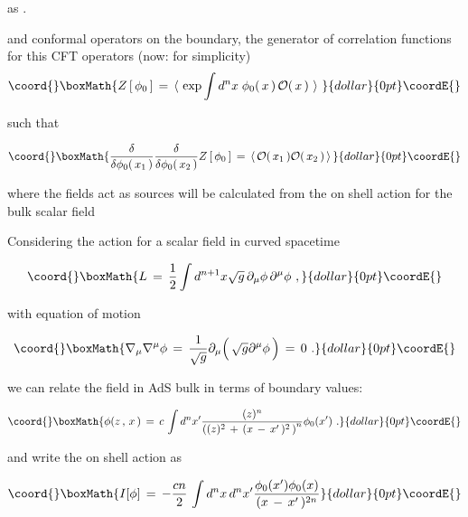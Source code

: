 \documentclass[a4paper,twocolumn,prd,groupedaddress,nofootinbib]{revtex4}
\begin{document}
\bigskip
 \coordHE{}  
as  \coordHE{}.

\vskip1cm

\noindent and conformal operators \coordHE{} on the boundary, 
the generator of correlation functions for this  CFT operators
(now: \coordHE{} for simplicity) 
$$\coord{}\boxMath{
Z\,[\,\phi_0 \,]\,=\, \langle \,\,\exp \int d^{n}x\; \phi_0 (\,x\,)\,
{\cal O} (\,x\,)\,\,\rangle\,\,
\nonumber
}{dollar}{0pt}\coordE{}$$

\noindent such that


$$\coord{}\boxMath{ 
{\delta\over \delta \phi_0 (\,x_1\,) } {\delta\over \delta \phi_0 (\,x_2\,) }
Z\,[\,\phi_0\,]\,=\,\langle \, { \cal O } (\,x_1\,){\cal O} (\,x_2\,)\,\rangle\,
}{dollar}{0pt}\coordE{}$$
 
\bigskip

\noindent  where the fields \coordHE{} act as {\cal sources} will be calculated from
the on shell  action \coordHE{} for the bulk scalar field 
 \coordHE{}



Considering the action for a scalar field in curved spacetime

$$\coord{}\boxMath{L\,=\,{1\over 2} \int d^{n+1}x \sqrt{g} \,\partial_\mu \phi \,
\partial^\mu \phi
\,\,,\nonumber
}{dollar}{0pt}\coordE{}$$

\noindent with equation of motion 

$$\coord{}\boxMath{
\label{motion}
\nabla_\mu \nabla^\mu \phi\,=\,{1\over \sqrt{g}} \partial_\mu 
\Big( \, \sqrt{g} \partial^\mu \phi \,\Big) 
\,=\,0\,\,.
}{dollar}{0pt}\coordE{}$$


\vskip1cm
\noindent we can relate the field in AdS bulk in terms of boundary values:

$$\coord{}\boxMath{
\label{solution}
\phi ( z\,,\,x \,)\,=\,c\,\int d^n x^{\prime} 
{ (z)^n \over \left( (z)^2 \,+\,
( x \,-\,{ x}^\prime \,)^2\,\right)^n} 
\phi_ 0 ({x}^\prime )\,\,.
}{dollar}{0pt}\coordE{}$$

\bigskip
\noindent and write the on shell action as

$$\coord{}\boxMath{
I [\phi ] \,=\, - {c n\over 2} \,\int d^n x \,d^n x^\prime 
{\phi_ 0 ({x}^\prime )
\phi_ 0 ({x} ) \over ( x \,-\,{x}^\prime \,)^{2n}}
}{dollar}{0pt}\coordE{}$$
\end{document}
